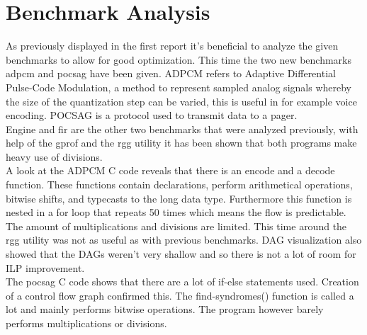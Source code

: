 \section{Benchmark Analysis}
As previously displayed in the first report it's beneficial to analyze the given benchmarks to allow for good optimization. 
This time the two new benchmarks adpcm and pocsag have been given. 
ADPCM refers to Adaptive Differential Pulse-Code Modulation, a method to represent sampled analog signals whereby the size of the quantization step can be varied, this is useful in for example voice encoding. 
POCSAG is a protocol used to transmit data to a pager.\\

Engine and fir are the other two benchmarks that were analyzed previously, with help of the gprof and the rgg utility it has been shown that both programs make heavy use of divisions.\\
A look at the ADPCM C code reveals that there is an encode and a decode function. 
These functions contain declarations, perform arithmetical operations, bitwise shifts, and typecasts to the long data type. 
Furthermore this function is nested in a for loop that repeats 50 times which means the flow is predictable. 
The amount of multiplications and divisions are limited. 
This time around the rgg utility was not as useful as with previous benchmarks. 
DAG visualization also showed that the DAGs weren't very shallow and so there is not a lot of room for ILP improvement.\\
The pocsag C code shows that there are a lot of if-else statements used. 
Creation of a control flow graph confirmed this.
The find-syndromes() function is called a lot and mainly performs bitwise operations. 
The program however barely performs multiplications or divisions.
